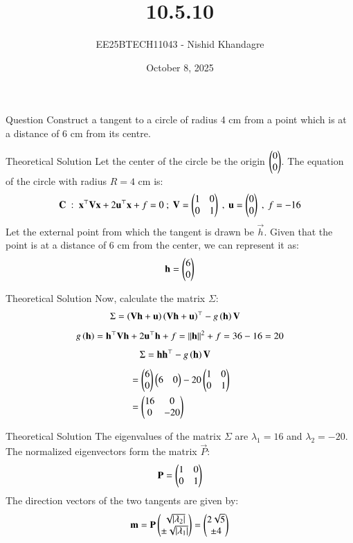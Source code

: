 \documentclass{beamer}
\title
{10.5.10}
\date{October 8, 2025}
\author
{EE25BTECH11043 - Nishid Khandagre}
\begin{document}
\frame{\titlepage}

\begin{frame}{Question}
Construct a tangent to a circle of radius 4 cm from a point which is at a distance of 6 cm from its centre.
\end{frame}

\begin{frame}{Theoretical Solution}
Let the center of the circle be the origin $\begin{pmatrix}0\\0\end{pmatrix}$.
The equation of the circle with radius $R=4$ cm is:
\begin{align}
    \mathbf{C} \ : \ \mathbf{x}^{\top}\mathbf{V}\mathbf{x} + 2\mathbf{u}^{\top}\mathbf{x} + f=0 \ ; \ \mathbf{V}=\begin{pmatrix}1&0\\0&1\end{pmatrix} \ , \ \mathbf{u}=\begin{pmatrix}0\\0\end{pmatrix} \ , \ f=-16
\end{align}
Let the external point from which the tangent is drawn be $\vec{h}$.
Given that the point is at a distance of 6 cm from the center, we can represent it as:
\begin{align}
    \mathbf{h}=\begin{pmatrix}6\\0\end{pmatrix}
\end{align}
\end{frame}

\begin{frame}{Theoretical Solution}
Now, calculate the matrix $\Sigma$:
\begin{align}
    \Sigma&=\left(\mathbf{V}\mathbf{h} + \mathbf{u}\right)\left(\mathbf{V}\mathbf{h} + \mathbf{u}\right)^{\top} - g\left(\mathbf{h}\right)\mathbf{V}
    \end{align}
    \begin{align}
    g\left(\mathbf{h}\right)=\mathbf{h}^{\top}\mathbf{V}\mathbf{h} + 2\mathbf{u}^{\top}\mathbf{h} + f = \left\lVert\mathbf{h}\right\rVert^2 +f = 36 - 16 = 20
    \end{align}
    \begin{align}
    \Sigma&= \mathbf{h}\mathbf{h}^{\top} - g\left(\mathbf{h}\right)\mathbf{V}
    \end{align}
    \begin{align}
    &= \begin{pmatrix}6 \\ 0\end{pmatrix}\begin{pmatrix}6 & 0\end{pmatrix} - 20\begin{pmatrix} 1& 0 \\ 0 &1\end{pmatrix}\\
    &= \begin{pmatrix}16 & 0 \\ 0 & -20\end{pmatrix}
\end{align}
\end{frame}

\begin{frame}{Theoretical Solution}
The eigenvalues of the matrix $\Sigma$ are $\lambda_1=16$ and $\lambda_2=-20$.
The normalized eigenvectors form the matrix $\vec{P}$:
\begin{align}
    \mathbf{P}=\begin{pmatrix}1 & 0\\0&1\end{pmatrix}
\end{align}
The direction vectors of the two tangents are given by:
\begin{align}
    \mathbf{m}=\mathbf{P}\begin{pmatrix}\sqrt{\left\vert\lambda_2\right\vert} \\ \pm\sqrt{\left\vert\lambda_1\right\vert}\end{pmatrix} =\begin{pmatrix}2\sqrt{5} \\ \pm 4\end{pmatrix}
\end{align}
\end{frame}
\end{document}
